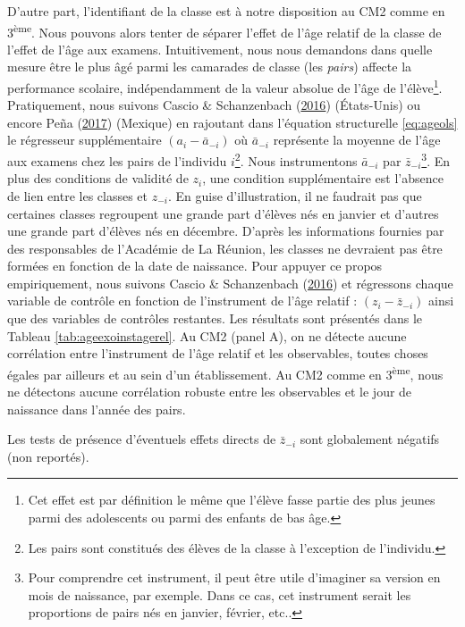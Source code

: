 \documentclass[
]{book}
\begin{document}
\quad D'autre part, l'identifiant de la classe est à notre disposition au CM2 comme en 3\textsuperscript{ème}. Nous pouvons alors tenter de séparer l'effet de l'âge relatif de la classe de l'effet de l'âge aux examens. Intuitivement, nous nous demandons dans quelle mesure être le plus âgé parmi les camarades de classe (les \emph{pairs}) affecte la performance scolaire, indépendamment de la valeur absolue de l'âge de l'élève\footnote{Cet effet est par définition le même que l'élève fasse partie des plus jeunes parmi des adolescents ou parmi des enfants de bas âge.}. Pratiquement, nous suivons Cascio \& Schanzenbach (\protect\hyperlink{ref-CAS:SCH:16}{2016}) (États-Unis) ou encore Peña (\protect\hyperlink{ref-PEN:17}{2017}) (Mexique) en rajoutant dans l'équation structurelle \eqref{eq:ageols} le régresseur supplémentaire \((a_i - \bar{a}_{-i})\) où \(\bar{a}_{-i}\) représente la moyenne de l'âge aux examens chez les pairs de l'individu \(i\)\footnote{Les pairs sont constitués des élèves de la classe à l'exception de l'individu.}. Nous instrumentons \(\bar{a}_{-i}\) par \(\bar{z}_{-i}\)\footnote{Pour comprendre cet instrument, il peut être utile d'imaginer sa version en mois de naissance, par exemple. Dans ce cas, cet instrument serait les proportions de pairs nés en janvier, février, etc..}. En plus des conditions de validité de \(z_i\), une condition supplémentaire est l'absence de lien entre les classes et \(z_{-i}\). En guise d'illustration, il ne faudrait pas que certaines classes regroupent une grande part d'élèves nés en janvier et d'autres une grande part d'élèves nés en décembre. D'après les informations fournies par des responsables de l'Académie de La Réunion, les classes ne devraient pas être formées en fonction de la date de naissance. Pour appuyer ce propos empiriquement, nous suivons Cascio \& Schanzenbach (\protect\hyperlink{ref-CAS:SCH:16}{2016}) et régressons chaque variable de contrôle en fonction de l'instrument de l'âge relatif : \((z_i - \bar{z}_{-i})\) ainsi que des variables de contrôles restantes. Les résultats sont présentés dans le Tableau \ref{tab:ageexoinstagerel}. Au CM2 (panel A), on ne détecte aucune corrélation entre l'instrument de l'âge relatif et les observables, toutes choses égales par ailleurs et au sein d'un établissement. Au CM2 comme en 3\textsuperscript{ème}, nous ne détectons aucune corrélation robuste entre les observables et le jour de naissance dans l'année des pairs.

\quad Les tests de présence d'éventuels effets directs de \(\bar{z}_{-i}\) sont globalement négatifs (non reportés).
\end{document}

